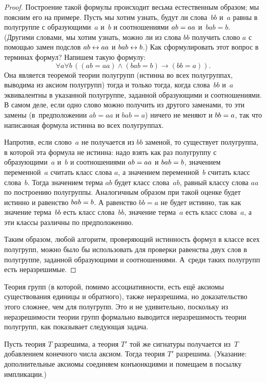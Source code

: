 \begin{proof}
Построение такой формулы происходит весьма естественным образом;
мы поясним его на примере. Пусть мы хотим узнать, будут ли
слова~$bb$ и~$a$ равны в полугруппе с образующими~$a$ и~$b$ и
соотношениями $ab\hm=aa$ и~$bab=b$. (Другими словами, мы хотим
узнать, можно ли из слова $bb$ получить слово $a$ с помощью
замен подслов $ab\hm\leftrightarrow aa$ и $bab\hm\leftrightarrow
b$.) Как сформулировать этот вопрос в терминах формул?
Напишем такую формулу:
        $$
\forall a\forall b\,((ab=aa)\land(bab=b)\to(bb=a)).
        $$
Она является теоремой теории полугрупп (истинна во всех
полугруппах, выводима из аксиом полугрупп) тогда и только тогда,
когда слова~$bb$ и~$a$ эквивалентны в указанной полугруппе,
заданной образующими и соотношениями. В самом деле, если одно
слово можно получить из другого заменами, то эти замены
(в~предположении $ab=aa$ и $bab=a$) ничего не меняют и
$bb\hm=a$, так что написанная формула истинна во всех
полугруппах.

Напротив, если слово~$a$ не получается из $bb$ заменой, то
существует
полугруппа, в которой эта формула не истинна: надо взять как раз
полугруппу с образующими~$a$ и~$b$ и соотношениями $ab\hm=aa$ и
$bab\hm=b$, значением переменной~$a$ считать класс слова $a$, а
значением переменной~$b$ считать класс слова~$b$. Тогда
значением терма $ab$ будет класс слова~$ab$, равный классу слова
$aa$ по построению полугруппы. Аналогичным образом при такой
оценке будет истинно и равенство $bab\hm=b$. А равенство $bb=a$
не будет истинно, так как значение терма~$bb$ есть класс
слова~$bb$, значение терма~$a$ есть класс слова~$a$, а эти
классы различны по предположению.

Таким образом, любой алгоритм, проверяющий истинность формул в
классе всех полугрупп, можно было бы использовать для проверки
равенства двух слов в полугруппе, заданной образующими и
соотношениями. А~среди таких полугрупп есть неразрешимые.
\end{proof}

Теория групп (в которой, помимо ассоциативности, есть
ещё аксиомы существования единицы и обратного), также
неразрешима, но доказательство этого сложнее, чем для
полугрупп. Это и не удивительно, поскольку из неразрешимости
теории групп формально выводится неразрешимость теории
полугрупп, как показывает следующая задача.

\begin{problem}
Пусть теория $T$ разрешима, а теория $T'$ той же сигнатуры
получается из~$T$ добавлением конечного числа аксиом. Тогда
теория $T'$ разрешима. (Указание: дополнительные аксиомы
соединяем конъюнкциями и помещаем в посылку импликации.)
\end{problem}

